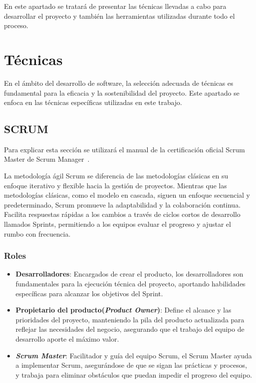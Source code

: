 
En este apartado se tratará de presentar las técnicas llevadas a cabo para desarrollar el proyecto y también las herramientas utilizadas durante todo el proceso.
\section{Técnicas}\label{sec4:tecnicas}
En el ámbito del desarrollo de software, la selección adecuada de técnicas es fundamental para la eficacia y la sostenibilidad del proyecto. Este apartado se enfoca en las técnicas específicas utilizadas en este trabajo.
\subsection{SCRUM}
Para explicar esta sección se utilizará el manual de la certificación oficial Scrum Master de Scrum Manager~\cite{SCRUM}.


La metodología ágil Scrum se diferencia de las metodologías clásicas en su enfoque iterativo y flexible hacia la gestión de proyectos. Mientras que las metodologías clásicas, como el modelo en cascada, siguen un enfoque secuencial y predeterminado, Scrum promueve la adaptabilidad y la colaboración continua. Facilita respuestas rápidas a los cambios a través de ciclos cortos de desarrollo llamados Sprints, permitiendo a los equipos evaluar el progreso y ajustar el rumbo con frecuencia.
\subsubsection{Roles}
\begin{itemize}
	\item \textbf{Desarrolladores}: Encargados de crear el producto, los desarrolladores son fundamentales para la ejecución técnica del proyecto, aportando habilidades específicas para alcanzar los objetivos del Sprint.
	\item \textbf{Propietario del producto(\textit{Product Owner})}: Define el alcance y las prioridades del proyecto, manteniendo la pila del producto actualizada para reflejar las necesidades del negocio, asegurando que el trabajo del equipo de desarrollo aporte el máximo valor.
	\item \textbf{\textit{Scrum Master}}: Facilitador y guía del equipo Scrum, el Scrum Master ayuda a implementar Scrum, asegurándose de que se sigan las prácticas y procesos, y trabaja para eliminar obstáculos que puedan impedir el progreso del equipo.
\end{itemize}
